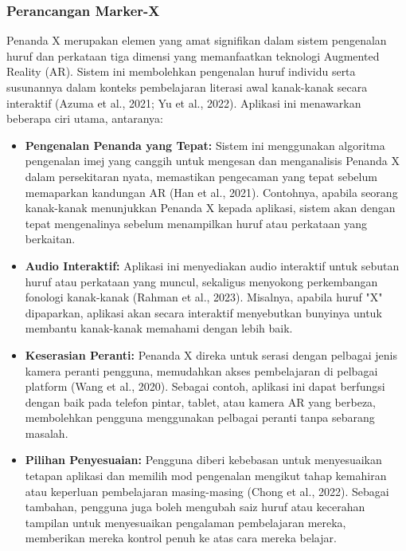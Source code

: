 \begin{itemize}
\begin{itemize}
\begin{itemize}
\begin{itemize}
\begin{itemize}
\begin{itemize}
\clearpage

\subsubsection{Perancangan Marker-X}

Penanda X merupakan elemen yang amat signifikan dalam sistem pengenalan huruf dan perkataan tiga dimensi yang memanfaatkan teknologi Augmented Reality (AR). Sistem ini membolehkan pengenalan huruf individu serta susunannya dalam konteks pembelajaran literasi awal kanak-kanak secara interaktif (Azuma et al., 2021; Yu et al., 2022). Aplikasi ini menawarkan beberapa ciri utama, antaranya:  \\
\begin{itemize}  
\item \textbf{Pengenalan Penanda yang Tepat:} Sistem ini menggunakan algoritma pengenalan imej yang canggih untuk mengesan dan menganalisis Penanda X dalam persekitaran nyata, memastikan pengecaman yang tepat sebelum memaparkan kandungan AR (Han et al., 2021). Contohnya, apabila seorang kanak-kanak menunjukkan Penanda X kepada aplikasi, sistem akan dengan tepat mengenalinya sebelum menampilkan huruf atau perkataan yang berkaitan.  \\
\item \textbf{Audio Interaktif:} Aplikasi ini menyediakan audio interaktif untuk sebutan huruf atau perkataan yang muncul, sekaligus menyokong perkembangan fonologi kanak-kanak (Rahman et al., 2023). Misalnya, apabila huruf "X" dipaparkan, aplikasi akan secara interaktif menyebutkan bunyinya untuk membantu kanak-kanak memahami dengan lebih baik.  \\
\item \textbf{Keserasian Peranti:} Penanda X direka untuk serasi dengan pelbagai jenis kamera peranti pengguna, memudahkan akses pembelajaran di pelbagai platform (Wang et al., 2020). Sebagai contoh, aplikasi ini dapat berfungsi dengan baik pada telefon pintar, tablet, atau kamera AR yang berbeza, membolehkan pengguna menggunakan pelbagai peranti tanpa sebarang masalah.  \\
\item \textbf{Pilihan Penyesuaian:} Pengguna diberi kebebasan untuk menyesuaikan tetapan aplikasi dan memilih mod pengenalan mengikut tahap kemahiran atau keperluan pembelajaran masing-masing (Chong et al., 2022). Sebagai tambahan, pengguna juga boleh mengubah saiz huruf atau kecerahan tampilan untuk menyesuaikan pengalaman pembelajaran mereka, memberikan mereka kontrol penuh ke atas cara mereka belajar.  




\end{itemize}
\end{itemize}
\end{itemize}
\end{itemize}
\end{itemize}
\end{itemize}
\end{itemize}
